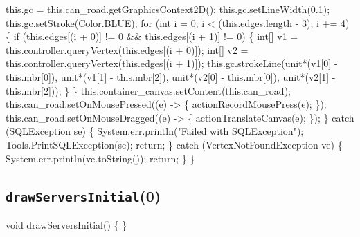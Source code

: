     this.gc = this.can_road.getGraphicsContext2D();
    this.gc.setLineWidth(0.1);
    this.gc.setStroke(Color.BLUE);
    for (int i = 0; i < (this.edges.length - 3); i += 4) \{
      if (this.edges[(i + 0)] != 0 && this.edges[(i + 1)] != 0) \{
        int[] v1 = this.controller.queryVertex(this.edges[(i + 0)]);
        int[] v2 = this.controller.queryVertex(this.edges[(i + 1)]);
        this.gc.strokeLine(unit*(v1[0] - this.mbr[0]), unit*(v1[1] - this.mbr[2]),
                           unit*(v2[0] - this.mbr[0]), unit*(v2[1] - this.mbr[2]));
      \}
    \}
    this.container_canvas.setContent(this.can_road);
    this.can_road.setOnMousePressed((e) -> \{ actionRecordMousePress(e); \});
    this.can_road.setOnMouseDragged((e) -> \{ actionTranslateCanvas(e); \});
  \} catch (SQLException se) \{
    System.err.println("Failed with SQLException");
    Tools.PrintSQLException(se);
    return;
  \} catch (VertexNotFoundException ve) \{
    System.err.println(ve.toString());
    return;
  \}
\}
\eatline
{}\nwendcode{}\nwdocspar
\subsection{\texttt{drawServersInitial}(0)}
\nwenddocs{}\endmoddef{}
void drawServersInitial() \{
\}
\nwendcode{}\nwdocspar

